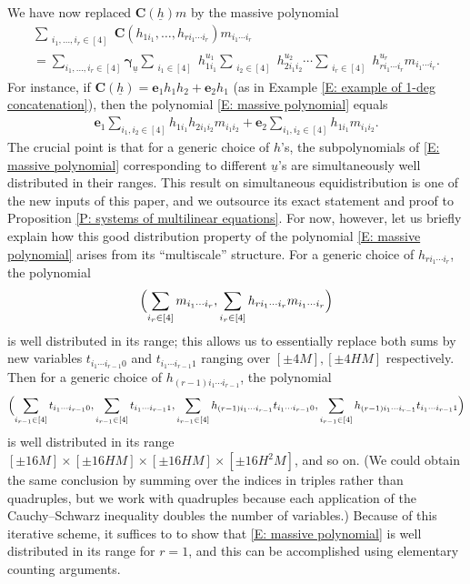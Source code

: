\documentclass[11pt]{amsart}
\theoremstyle{definition}
\newcommand{\bc}{{\mathbf{C}}}
\newcommand{\be}{{\mathbf{e}}}
\newcommand{\bgamma}{{\boldsymbol{\gamma}}}
\newcommand{\uh}{{\underline{h}}}
\newcommand{\uu}{{\underline{u}}}
\newcommand{\Bigbrac}[1]{\Bigl( #1 \Bigr)}
\begin{document}
We have now replaced $\bc(\uh)m$ by the massive polynomial 
\begin{multline}\label{E: massive polynomial}
    \sum_{\substack{i_1, \ldots, i_r\in [4]}}\bc(h_{1i_1}, \ldots, h_{ri_1\cdots  i_r})m_{i_1\cdots  i_r}\\
    = \sum_{i_1, \ldots, i_r\in[4]}\bgamma_\uu \sum_{\substack{i_1\in[4]}}h_{1i_1}^{u_1}
    \sum_{\substack{i_2\in[4]}}h_{2i_1i_2}^{u_2}\cdots \sum_{\substack{i_r\in[4]}} h_{ri_1\cdots  i_r}^{u_{r}} m_{i_1\cdots  i_r}.
\end{multline}
For instance, if $\bc(\uh) = \be_1  h_1 h_2+\be_2 h_1$ (as in Example \ref{E: example of 1-deg concatenation}), then the polynomial \eqref{E: massive polynomial} equals
\begin{align*}
    \be_1\sum_{i_1, i_2\in[4]}h_{1i_1}h_{2i_1i_2}m_{i_1i_2} +\be_2\sum_{i_1, i_2\in[4]}h_{1i_1}m_{i_1i_2}.
\end{align*}
The crucial point is that for a generic choice of $h$'s, the subpolynomials of \eqref{E: massive polynomial} corresponding to different $\uu$'s are simultaneously well distributed in their ranges.  This result on simultaneous equidistribution is one of the new inputs of this paper, and we outsource its exact statement and proof to Proposition \ref{P: systems of multilinear equations}. For now, however, let us briefly explain how this good distribution property of the polynomial \eqref{E: massive polynomial} arises from its ``multiscale'' structure. For a generic choice of $h_{ri_1\cdots  i_r}$, the polynomial $$\Bigbrac{\sum_{\substack{i_r\in[4]}} m_{i_1\cdots  i_r}, \sum_{\substack{i_r\in[4]}} h_{ri_1\cdots  i_r} m_{i_1\cdots  i_r}}$$ is well distributed in its range; this allows us to essentially replace both sums by new variables $t_{i_1\cdots  i_{r-1}0}$ and $t_{i_1\cdots  i_{r-1}1}$ ranging over $[\pm 4 M], [\pm 4HM]$ respectively. 
Then for a generic choice of $h_{(r-1)i_1\cdots i_{r-1}}$, the polynomial
\begin{align*}
    \Bigbrac{\sum_{i_{r-1}\in[4]}t_{i_1\cdots  i_{r-1}0}, \sum_{i_{r-1}\in[4]}t_{i_1\cdots  i_{r-1}1}, \sum_{i_{r-1}\in[4]}h_{(r-1)i_1\cdots  i_{r-1}} t_{i_1\cdots  i_{r-1}0}, \sum_{i_{r-1}\in[4]}h_{(r-1)i_1\cdots  i_{r-1}} t_{i_1\cdots  i_{r-1}1}}    
\end{align*}
 is well distributed in its range $[\pm 16 M]
\times [\pm 16HM]\times [\pm 16HM]
\times [\pm 16H^2M]$, and so on. (We could obtain the same conclusion by summing over the indices in triples rather than quadruples, but we work with quadruples because each application of the Cauchy--Schwarz inequality doubles the number of variables.)
Because of this iterative scheme, it suffices to to show that \eqref{E: massive polynomial} is well distributed in its range for $r=1$, and this can be accomplished using elementary counting arguments.
\end{document}
